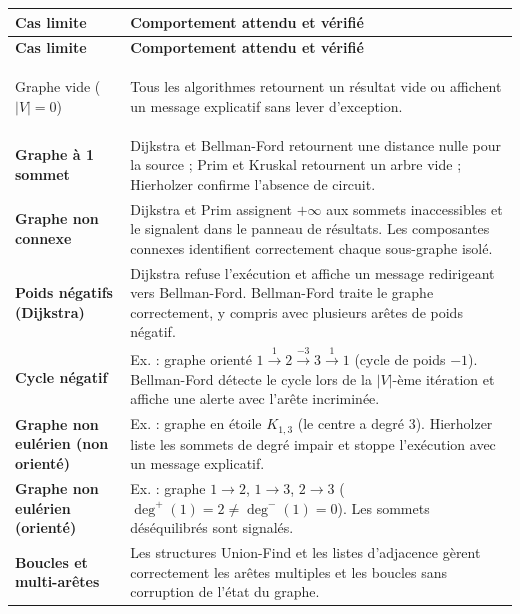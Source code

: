 \documentclass[a4paper,12pt]{report}
\begin{document}
\renewcommand{\arraystretch}{1.3}
\begin{longtable}{>{\bfseries}p{4cm} p{9.5cm}}
\rowcolor{headerblue}
\color{white}\textbf{Cas limite} & \color{white}\textbf{Comportement attendu et vérifié} \\
\hline
\endfirsthead
\rowcolor{headerblue}
\color{white}\textbf{Cas limite} & \color{white}\textbf{Comportement attendu et vérifié} \\
\hline
\endhead
 
\rowcolor{teal100}
Graphe vide ($|V|=0$) &
Tous les algorithmes retournent un résultat vide ou affichent un message explicatif sans lever d'exception. \\
 
Graphe à 1 sommet &
Dijkstra et Bellman-Ford retournent une distance nulle pour la source ; Prim et Kruskal retournent un arbre vide ; Hierholzer confirme l'absence de circuit. \\
 
\rowcolor{teal100}
Graphe non connexe &
Dijkstra et Prim assignent $+\infty$ aux sommets inaccessibles et le signalent dans le panneau de résultats. Les composantes connexes identifient correctement chaque sous-graphe isolé. \\
 
Poids négatifs (Dijkstra) &
Dijkstra refuse l'exécution et affiche un message redirigeant vers Bellman-Ford. Bellman-Ford traite le graphe correctement, y compris avec plusieurs arêtes de poids négatif. \\
 
\rowcolor{teal100}
Cycle négatif &
Ex. : graphe orienté $1\xrightarrow{1}2\xrightarrow{-3}3\xrightarrow{1}1$ (cycle de poids $-1$). Bellman-Ford détecte le cycle lors de la $|V|$-ème itération et affiche une alerte avec l'arête incriminée. \\
 
Graphe non eulérien (non orienté) &
Ex. : graphe en étoile $K_{1,3}$ (le centre a degré 3). Hierholzer liste les sommets de degré impair et stoppe l'exécution avec un message explicatif. \\
 
\rowcolor{teal100}
Graphe non eulérien (orienté) &
Ex. : graphe $1\to2$, $1\to3$, $2\to3$ ($\deg^+(1)=2 \neq \deg^-(1)=0$). Les sommets déséquilibrés sont signalés. \\
 
Boucles et multi-arêtes &
Les structures Union-Find et les listes d'adjacence gèrent correctement les arêtes multiples et les boucles sans corruption de l'état du graphe. \\
 
\end{longtable}
 
\end{document}
